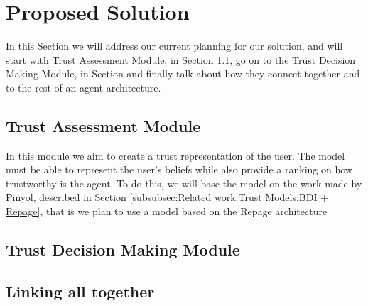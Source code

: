 \section{Proposed Solution}
\label{sec:Solution}
In this Section we will address our current planning for our solution, and will start with Trust Assessment Module, in Section \ref{subsec:Solution:Trust Assessment Module}, go on to the Trust Decision Making Module, in Section and finally talk about how they connect together and to the rest of an agent architecture.


\subsection{Trust Assessment Module}
\label{subsec:Solution:Trust Assessment Module}
In this module we aim to create a trust representation of the user. The model must be able to represent the user's beliefs while also provide a ranking on how trustworthy is the agent. To do this, we will base the model on the work made by Pinyol\cite{Pinyol2009}, described in Section \ref{subsubsec:Related work:Trust Models:BDI + Repage}, that is we plan to use a model based on the Repage architecture 



\subsection{Trust Decision Making Module}
\label{subsec:Solution:Trust Decision Making Module}

\subsection{Linking all together}
\label{subsec:Solution:Linking all together}
